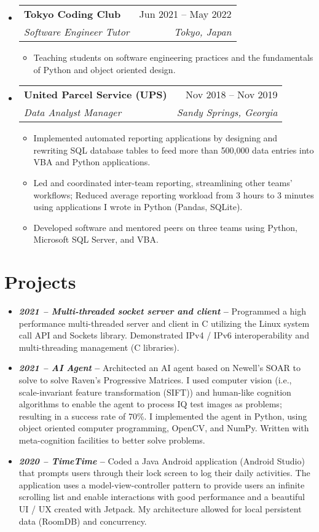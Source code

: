 \documentclass[12pt, letter]{article}
\makeatletter
\newcommand{\resumeItem}[1]{
  \item\small{
    {#1 \vspace{-2pt}}
  }
}
\newcommand{\resumeSubheading}[4]{
  \vspace{-2pt}\item
    \begin{tabular*}{0.97\textwidth}[t]{l@{\extracolsep{\fill}}r}
      \textbf{#1} & #2 \\
      \textit{\small#3} & \textit{\small #4} \\
    \end{tabular*}\vspace{-7pt}
}
\newcommand{\resumeSubHeadingListStart}{\begin{itemize}[leftmargin=0.15in, label={}]}
\newcommand{\resumeSubHeadingListEnd}{\end{itemize}}
\newcommand{\resumeItemListStart}{\begin{itemize}[noitemsep]} %
\newcommand{\resumeItemListEnd}{\end{itemize}\vspace{-16pt}}
\makeatother
\begin{document}
\resumeSubHeadingListStart
  \resumeSubheading
    {Tokyo Coding Club }{Jun 2021 -- May 2022}
    {Software Engineer Tutor}{Tokyo, Japan}
    \resumeItemListStart
      \resumeItem{Teaching students on software engineering practices and the fundamentals of Python and object oriented design.}
    \resumeItemListEnd
    \resumeSubHeadingListEnd

\resumeSubHeadingListStart
  \resumeSubheading
    {United Parcel Service (UPS)}{Nov 2018 -- Nov 2019}
    {Data Analyst Manager}{Sandy Springs, Georgia}
    \resumeItemListStart
      \resumeItem{Implemented automated reporting applications by designing and rewriting SQL database tables to feed more than 500,000 data entries into VBA and Python applications.}
      \resumeItem{Led and coordinated inter-team reporting, streamlining other teams' workflows; Reduced average reporting workload from 3 hours to 3 minutes using applications I wrote in Python (Pandas, SQLite).}
      \resumeItem{Developed software and mentored peers on three teams using Python, Microsoft SQL Server, and VBA.}
    \resumeItemListEnd
    \resumeSubHeadingListEnd

\section{Projects}

\begin{itemize}
  \item {\small \textbf{\textit{2021 -- Multi-threaded socket server and client} --} Programmed a high performance multi-threaded server and client in C utilizing the Linux system call API and Sockets library. Demonstrated IPv4 / IPv6 interoperability and multi-threading management (C libraries).}
  \item {\small \textbf{\textit{2021 -- AI Agent} --} Architected an AI agent based on Newell's SOAR to solve to solve Raven's Progressive Matrices. I used computer vision (i.e., scale-invariant feature transformation (SIFT)) and human-like cognition algorithms to enable the agent to process IQ test images as problems; resulting in a success rate of 70\%. I implemented the agent in Python, using object oriented computer programming, OpenCV, and NumPy. Written with meta-cognition facilities to better solve problems.}
  \item {\small \textbf{\textit{2020 -- TimeTime} --}  Coded a Java Android application (Android Studio) that prompts users through their lock screen to log their daily activities. The application uses a model-view-controller pattern to provide users an infinite scrolling list and enable interactions with good performance and a beautiful UI / UX created with Jetpack. My architecture allowed for local persistent data (RoomDB) and concurrency.}
\end{itemize}
\end{document}
